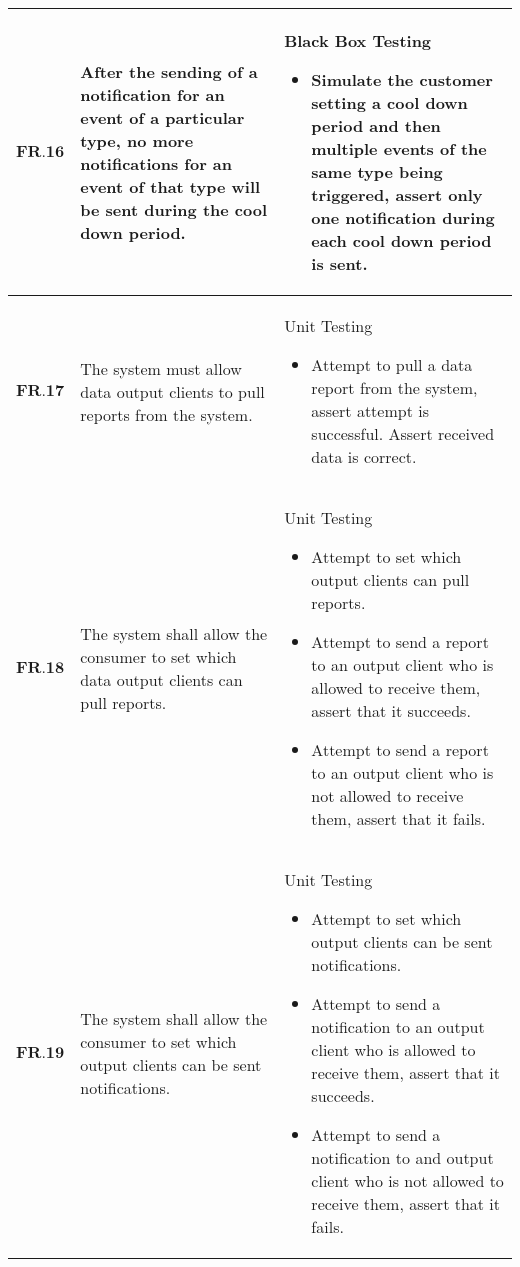 \begin{longtable}[H]{| p{1.5cm}| p{4.5cm}| p{10.5cm}|}
        $\textbf{FR.16}$ & After the sending of a notification for an event of a particular type, no more notifications for an event of that type will be sent during the cool down period. & Black Box Testing\begin{itemize}\item Simulate the customer setting a cool down period and then multiple events of the same type being triggered, assert only one notification during each cool down period is sent.\end{itemize}                                                                                                                    \\ \hline
        $\textbf{FR.17}$ & The system must allow data output clients to pull reports from the system.                                                                                       & Unit Testing\begin{itemize}\item Attempt to pull a data report from the system, assert attempt is successful. Assert received data is correct.\end{itemize}                                                                                                                                                                                          \\ \hline
       $ \textbf{FR.18}$ & The system shall allow the consumer to set which data output clients can pull reports.                                                                           & Unit Testing\begin{itemize}\item Attempt to set which output clients can pull reports.\item Attempt to send a report to an output client who is allowed to receive them, assert that it succeeds.\item Attempt to send a report to an output client who is not allowed to receive them, assert that it fails.\end{itemize}                 \\ \hline
    	$\textbf{FR.19}$ & The system shall allow the consumer to set which output clients can be sent notifications.                                                                       & Unit Testing\begin{itemize}\item Attempt to set which output clients can be sent notifications.\item Attempt to send a notification to an output client who is allowed to receive them, assert that it succeeds.\item Attempt to send a notification to and output client who is not allowed to receive them, assert that it fails.\end{itemize} \\ \hline
\end{longtable}
